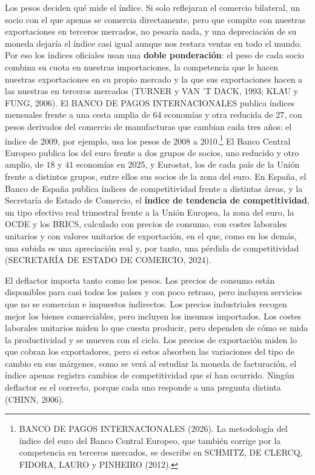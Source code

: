 \documentclass[10pt,a4paper]{article}
\begin{document}
Los pesos deciden qué mide el índice. Si solo reflejaran el comercio bilateral, un socio con el que apenas se comercia directamente, pero que compite con nuestras exportaciones en terceros mercados, no pesaría nada, y una depreciación de su moneda dejaría el índice casi igual aunque nos restara ventas en todo el mundo. Por eso los índices oficiales usan una \textbf{doble ponderación}: el peso de cada socio combina su cuota en nuestras importaciones, la competencia que le hacen nuestras exportaciones en su propio mercado y la que sus exportaciones hacen a las nuestras en terceros mercados (TURNER y VAN 'T DACK, 1993; KLAU y FUNG, 2006). El BANCO DE PAGOS INTERNACIONALES publica índices mensuales frente a una cesta amplia de $64$ economías y otra reducida de $27$, con pesos derivados del comercio de manufacturas que cambian cada tres años: el índice de 2009, por ejemplo, usa los pesos de 2008 a 2010.\footnote{%
    BANCO DE PAGOS INTERNACIONALES (2026). La metodología del índice del euro del Banco Central Europeo, que también corrige por la competencia en terceros mercados, se describe en SCHMITZ, DE CLERCQ, FIDORA, LAURO y PINHEIRO (2012).
} El Banco Central Europeo publica los del euro frente a dos grupos de socios, uno reducido y otro amplio, de $18$ y $41$ economías en 2025, y Eurostat, los de cada país de la Unión frente a distintos grupos, entre ellos sus socios de la zona del euro. En España, el Banco de España publica índices de competitividad frente a distintas áreas, y la Secretaría de Estado de Comercio, el \textbf{índice de tendencia de competitividad}, un tipo efectivo real trimestral frente a la Unión Europea, la zona del euro, la OCDE y los BRICS, calculado con precios de consumo, con costes laborales unitarios y con valores unitarios de exportación, en el que, como en los demás, una subida es una apreciación real y, por tanto, una pérdida de competitividad (SECRETARÍA DE ESTADO DE COMERCIO, 2024).

El deflactor importa tanto como los pesos. Los precios de consumo están disponibles para casi todos los países y con poco retraso, pero incluyen servicios que no se comercian e impuestos indirectos. Los precios industriales recogen mejor los bienes comerciables, pero incluyen los insumos importados. Los costes laborales unitarios miden lo que cuesta producir, pero dependen de cómo se mida la productividad y se mueven con el ciclo. Los precios de exportación miden lo que cobran los exportadores, pero si estos absorben las variaciones del tipo de cambio en sus márgenes, como se verá al estudiar la moneda de facturación, el índice apenas registra cambios de competitividad que sí han ocurrido. Ningún deflactor es el correcto, porque cada uno responde a una pregunta distinta (CHINN, 2006).
\end{document}
